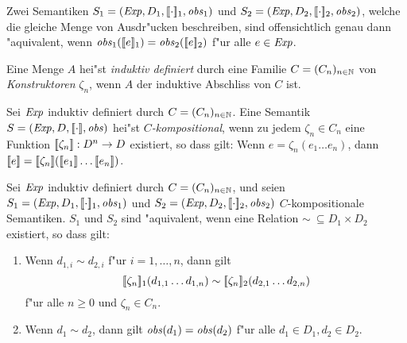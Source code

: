 \documentclass[12pt,a4paper]{article}
\begin{document}
\begin{lemma}
  Zwei Semantiken $S_1=(\mathit{Exp},D_1,[\![\cdot]\!]_1,\mathit{obs}_1)$ und $S_2=(\mathit{Exp},D_2,[\![\cdot]\!]_2,\mathit{obs}_2)$,
  welche die gleiche Menge von Ausdr"ucken beschreiben, sind offensichtlich genau dann "aquivalent, wenn
  $\mathit{obs}_1([\![e]\!]_1)=\mathit{obs}_2([\![e]\!]_2)$ f"ur alle $e \in \mathit{Exp}$.
\end{lemma}

\begin{definition}
  Eine Menge $A$ hei"st \emph{induktiv definiert} durch eine Familie $C = (C_n)_{n\in\mathbb N}$ von
  \emph{Konstruktoren} $\zeta_n$, wenn $A$ der induktive Abschliss von $C$ ist.
\end{definition}

\begin{definition}[Kompositionalit"at]
  Sei $\mathit{Exp}$ induktiv definiert durch $C=(C_n)_{n\in\mathbb N}$.
  Eine Semantik $S=(\mathit{Exp},D,[\![\cdot]\!],\mathit{obs})$ hei"st \emph{$C$-kompositional},
  wenn zu jedem $\zeta_n \in C_n$ eine Funktion $[\![\zeta_n]\!]: D^n \to D$ existiert, so dass gilt:
  Wenn $e = \zeta_n (e_1 \ldots e_n)$, dann 
  $\semantic{e} = \semantic{\zeta_n}(\semantic{e_1} \ldots \semantic{e_n})$.
\end{definition}

\begin{theorem}
  Sei $\mathit{Exp}$ induktiv definiert durch $C=(C_n)_{n\in\mathbb N}$, und seien \linebreak
  $S_1 = (\mathit{Exp},D_1,[\![\cdot]\!]_1,\mathit{obs}_1)$ und $S_2 = (\mathit{Exp},D_2,[\![\cdot]\!]_2,\mathit{obs}_2)$
  $C$-kompositionale Semantiken. $S_1$ und $S_2$ sind "aquivalent, wenn eine Relation
  $\sim\ \subseteq D_1 \times D_2$ existiert, so dass gilt:
  \begin{enumerate}
  \item Wenn $d_{1,i} \sim d_{2,i}$ f"ur $i=1,\ldots,n$, dann gilt
    \[[\![\zeta_n]\!]_1 (d_{1,1} \ldots d_{1,n}) \sim [\![\zeta_n]\!]_2 (d_{2,1} \ldots d_{2,n})\]
    f"ur alle $n \ge 0$ und $\zeta_n \in C_n$.
  \item Wenn $d_1 \sim d_2$, dann gilt $\mathit{obs}(d_1) = \mathit{obs}(d_2)$ f"ur alle $d_1 \in D_1, d_2 \in D_2$.
  \end{enumerate}
\end{theorem}
\end{document}
